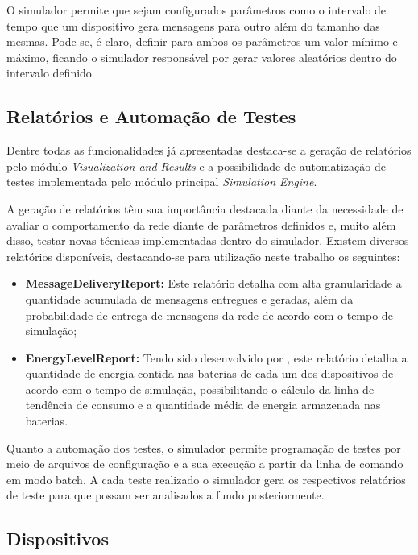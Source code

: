 O simulador permite que sejam configurados parâmetros como o intervalo de tempo que um dispositivo gera mensagens para outro além do tamanho das mesmas. Pode-se, é claro, definir para ambos os parâmetros um valor mínimo e máximo, ficando o simulador responsável por gerar valores aleatórios dentro do intervalo definido.

\subsection{Relatórios e Automação de Testes}

Dentre todas as funcionalidades já apresentadas destaca-se a geração de relatórios pelo módulo \emph{Visualization and Results} e a possibilidade de automatização de testes implementada pelo módulo principal \emph{Simulation Engine}. 

A geração de relatórios têm sua importância destacada diante da necessidade de avaliar o comportamento da rede diante de parâmetros definidos e, muito além disso, testar novas técnicas implementadas dentro do simulador. Existem diversos relatórios disponíveis, destacando-se para utilização neste trabalho os seguintes:

\begin{itemize}
    \item \textbf{MessageDeliveryReport:} Este relatório detalha com alta granularidade a quantidade acumulada de mensagens entregues e geradas, além da probabilidade de entrega de mensagens da rede de acordo com o tempo de simulação;
    \item \textbf{EnergyLevelReport:} Tendo sido desenvolvido por \cite{denis_artigo}, este relatório detalha a quantidade de energia contida nas baterias de cada um dos dispositivos de acordo com o tempo de simulação, possibilitando o cálculo da linha de tendência de consumo e a quantidade média de energia armazenada nas baterias.
\end{itemize}

Quanto a automação dos testes, o simulador permite programação de testes por meio de arquivos de configuração e a sua execução a partir da linha de comando em modo batch. A cada teste realizado o simulador gera os respectivos relatórios de teste para que possam ser analisados a fundo posteriormente.

\subsection{Dispositivos}

